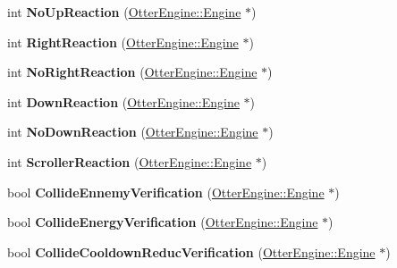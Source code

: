 \begin{DoxyCompactItemize}
\item 
int {\bfseries No\+Up\+Reaction} (\hyperlink{class_otter_engine_1_1_engine}{Otter\+Engine\+::\+Engine} $\ast$)\hypertarget{class_player_aba6855968521d9425a26df8092f3af38}{}\label{class_player_aba6855968521d9425a26df8092f3af38}

\item 
int {\bfseries Right\+Reaction} (\hyperlink{class_otter_engine_1_1_engine}{Otter\+Engine\+::\+Engine} $\ast$)\hypertarget{class_player_a0cb7acc18392add0f70c28c7ed495078}{}\label{class_player_a0cb7acc18392add0f70c28c7ed495078}

\item 
int {\bfseries No\+Right\+Reaction} (\hyperlink{class_otter_engine_1_1_engine}{Otter\+Engine\+::\+Engine} $\ast$)\hypertarget{class_player_a1e96bc15a24315b253dd5e7d9427290c}{}\label{class_player_a1e96bc15a24315b253dd5e7d9427290c}

\item 
int {\bfseries Down\+Reaction} (\hyperlink{class_otter_engine_1_1_engine}{Otter\+Engine\+::\+Engine} $\ast$)\hypertarget{class_player_a1dce3538c9266f8f66aff44448ac8ca8}{}\label{class_player_a1dce3538c9266f8f66aff44448ac8ca8}

\item 
int {\bfseries No\+Down\+Reaction} (\hyperlink{class_otter_engine_1_1_engine}{Otter\+Engine\+::\+Engine} $\ast$)\hypertarget{class_player_a8172df9c77943a0ef323820b221b4bc2}{}\label{class_player_a8172df9c77943a0ef323820b221b4bc2}

\item 
int {\bfseries Scroller\+Reaction} (\hyperlink{class_otter_engine_1_1_engine}{Otter\+Engine\+::\+Engine} $\ast$)\hypertarget{class_player_a2ffdc77ab2415478e18afcc4272c6148}{}\label{class_player_a2ffdc77ab2415478e18afcc4272c6148}

\item 
bool {\bfseries Collide\+Ennemy\+Verification} (\hyperlink{class_otter_engine_1_1_engine}{Otter\+Engine\+::\+Engine} $\ast$)\hypertarget{class_player_a264ae02923bc2d4cfc854afdfd2a6576}{}\label{class_player_a264ae02923bc2d4cfc854afdfd2a6576}

\item 
bool {\bfseries Collide\+Energy\+Verification} (\hyperlink{class_otter_engine_1_1_engine}{Otter\+Engine\+::\+Engine} $\ast$)\hypertarget{class_player_a73f14e4e0d98d74624bf9216afcfdf15}{}\label{class_player_a73f14e4e0d98d74624bf9216afcfdf15}

\item 
bool {\bfseries Collide\+Cooldown\+Reduc\+Verification} (\hyperlink{class_otter_engine_1_1_engine}{Otter\+Engine\+::\+Engine} $\ast$)\hypertarget{class_player_aaa902fbc2e805dcc3fcda1b74d608e47}{}\label{class_player_aaa902fbc2e805dcc3fcda1b74d608e47}


\end{DoxyCompactItemize}
